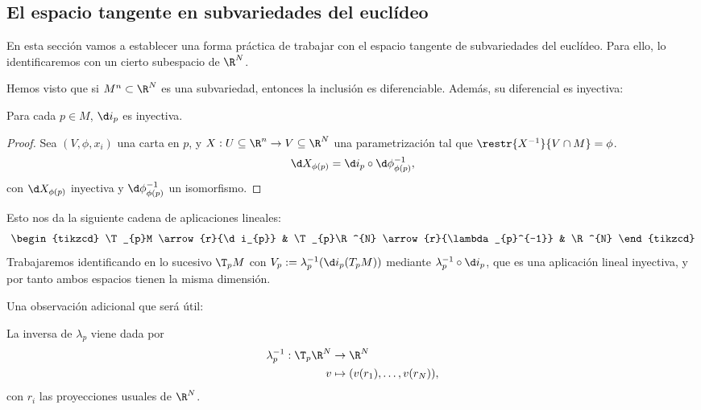 \subsection{El espacio tangente en subvariedades del euclídeo} \label{sec:tan-subv}

En esta sección vamos a establecer una forma práctica de trabajar con el espacio
tangente de subvariedades del euclídeo. Para ello, lo identificaremos con un
cierto subespacio de $\R^{N}$.

Hemos visto que si $M^{n}\subset \R^{N}$ es una subvariedad, entonces la
inclusión es diferenciable. Además, su diferencial es inyectiva:
\begin{nprop}
  Para cada $p\in M$, $\d i_{p}$ es inyectiva.
\end{nprop}
\begin{proof}
  Sea $(V,\phi,x_{i})$ una carta en $p$, y $X: U\subseteq \R^{n}\to V\subseteq
  \R^{N}$ una parametrización tal que $\restr{X^{-1}}{V\cap M} = \phi$.
  \[
    \d X_{\phi(p)} = \d
      i_{p} \circ \d \phi^{-1}_{\phi(p)},
  \]
  con $\d X_{\phi(p)}$ inyectiva y $\d \phi^{-1}_{\phi(p)}$ un isomorfismo.
\end{proof}

Esto nos da la siguiente cadena de aplicaciones lineales:
\[
  \begin{tikzcd}
    \T_{p}M \arrow{r}{\d i_{p}} & \T_{p}\R^{N} \arrow{r}{\lambda_{p}^{-1}} & \R^{N}
  \end{tikzcd}
\]
Trabajaremos identificando en lo sucesivo $\T_{p}M$ con $V_{p} :=
\lambda^{-1}_{p}(\d i_{p}(T_{p}M))$ mediante $\lambda_{p}^{-1}\circ \d i_{p}$,
que es una aplicación lineal inyectiva, y por tanto ambos espacios tienen la
misma dimensión.

Una observación adicional que será útil:
\begin{nprop} \label{prop:inversa-lambda}
  La inversa de $\lambda_{p}$ viene dada por
  \begin{alignat*}{2}
    \lambda_{p}^{-1}: \T_{p}\R^{N} & \to \R^{N} \\
   v & \mapsto (v(r_{1}),\dots,v(r_{N})),
 \end{alignat*}
 con $r_{i}$ las proyecciones usuales de $\R^{N}$.
\end{nprop}


